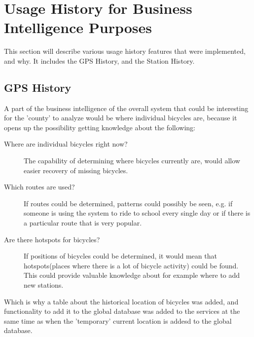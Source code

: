 \section{Usage History for Business Intelligence Purposes}
This section will describe various usage history features that were implemented, and why. It includes the GPS History, and the Station History.

\subsection{GPS History}
A part of the business intelligence of the overall system that could be interesting for the 'county' to analyze would be where individual bicycles are, because it opens up the possibility getting knowledge about the following:

\begin{description}
\item[Where are individual bicycles right now?] The capability of determining where bicycles currently are, would allow easier recovery of missing bicycles.
\item[Which routes are used?] If routes could be determined, patterns could possibly be seen, e.g. if someone is using the system to ride to school every single day or if there is a particular route that is very popular.
\item[Are there hotspots for bicycles?] If positions of bicycles could be determined, it would mean that hotspots(places where there is a lot of bicycle activity) could be found. This could provide valuable knowledge about for example where to add new stations.
\end{description}

Which is why a table about the historical location of bicycles was added, and functionality to add it to the global database was added to the services at the same time as when the 'temporary' current location is addesd to the global database.